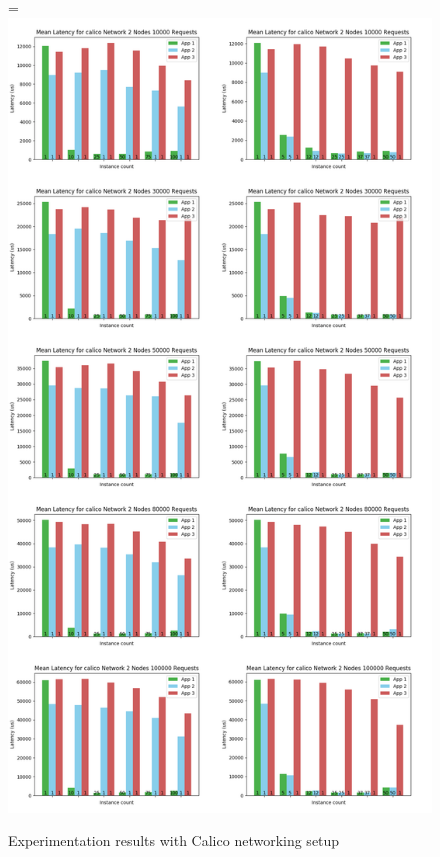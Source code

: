 \documentclass[12pt,oneandhalf,chaparabic,ceng,ms,eng,oneside,pntc]{gsufbe}
\makeatletter
\let\old@includegraphics\includegraphics
\renewcommand{\includegraphics}[2][,]{%
  \setbox9=\hbox{\old@includegraphics[#1]{#2}}%
  \ifdim\wd9>\textwidth
    \old@includegraphics[#1,width=\textwidth]{#2}%
  \else
    \old@includegraphics[#1]{#2}%
  \fi%
}
\makeatother
\begin{document}
\begin{figure}
\centering
\includegraphics[]{calico.png}
\caption{Experimentation results with Calico networking setup}
\label{rnp1}
\end{figure}
\end{document}
